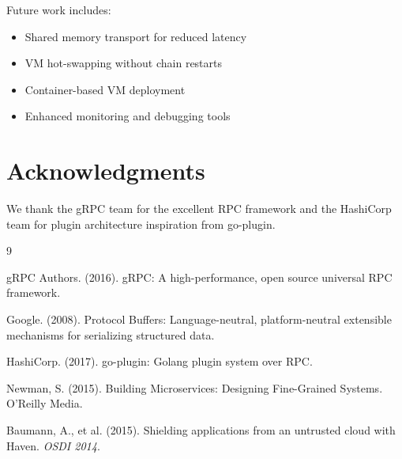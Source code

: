 \documentclass[11pt,letterpaper]{article}
\begin{document}
Future work includes:
\begin{itemize}
    \item Shared memory transport for reduced latency
    \item VM hot-swapping without chain restarts
    \item Container-based VM deployment
    \item Enhanced monitoring and debugging tools
\end{itemize}

\section*{Acknowledgments}

We thank the gRPC team for the excellent RPC framework and the HashiCorp team for plugin architecture inspiration from go-plugin.


\begin{thebibliography}{9}

gRPC Authors. (2016). gRPC: A high-performance, open source universal RPC framework.

Google. (2008). Protocol Buffers: Language-neutral, platform-neutral extensible mechanisms for serializing structured data.

HashiCorp. (2017). go-plugin: Golang plugin system over RPC.

Newman, S. (2015). Building Microservices: Designing Fine-Grained Systems. O'Reilly Media.

Baumann, A., et al. (2015). Shielding applications from an untrusted cloud with Haven. \textit{OSDI 2014}.

\end{thebibliography}
\end{document}
